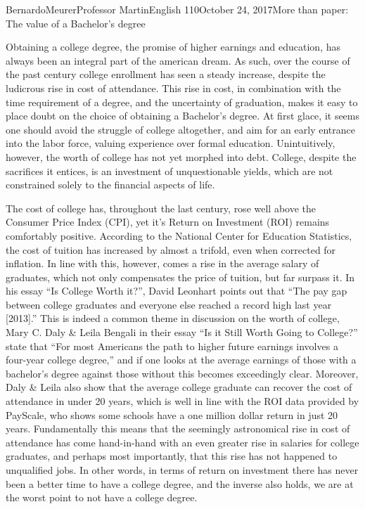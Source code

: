 \documentclass[12pt,letterpaper]{article}
\begin{document}
        \begin{mla}{Bernardo}{Meurer}{Professor Martin}{English 110}{October 24, 2017}{More than paper: The value of a Bachelor's degree}
        
        Obtaining a college degree, the promise of higher earnings and education, has always been an integral part of the american dream. As such, over the course of the past century college enrollment has seen a steady increase, despite the ludicrous rise in cost of attendance. This rise in cost, in combination with the time requirement of a degree, and the uncertainty of graduation, makes it easy to place doubt on the choice of obtaining a Bachelor's degree. At first glace, it seems one should avoid the struggle of college altogether, and aim for an early entrance into the labor force, valuing experience over formal education. Unintuitively, however, the worth of college has not yet morphed into debt. College, despite the sacrifices it entices, is an investment of unquestionable yields, which are not constrained solely to the financial aspects of life.
    
        The cost of college has, throughout the last century, rose well above the Consumer Price Index (CPI), yet it's Return on Investment (ROI) remains comfortably positive. According to the National Center for Education Statistics, the cost of tuition has increased by almost a trifold, even when corrected for inflation. In line with this, however, comes a rise in the average salary of graduates, which not only compensates the price of tuition, but far surpass it. In his essay ``Is College Worth it?'', David Leonhart points out that ``The pay gap between college graduates and everyone else reached a record high last year [2013].'' This is indeed a common theme in discussion on the worth of college, Mary C. Daly \& Leila Bengali in their essay ``Is it Still Worth Going to College?'' state that ``For most Americans the path to higher future earnings involves a four-year college degree,'' and if one looks at the average earnings of those with a bachelor's degree against those without this becomes exceedingly clear. Moreover, Daly \& Leila also show that the average college graduate can recover the cost of attendance in under 20 years, which is well in line with the ROI data provided by PayScale, who shows some schools have a one million dollar return in just 20 years. Fundamentally this means that the seemingly astronomical rise in cost of attendance has come hand-in-hand with an even greater rise in salaries for college graduates, and perhaps most importantly, that this rise has not happened to unqualified jobs. In other words, in terms of return on investment there has never been a better time to have a college degree, and the inverse also holds, we are at the worst point to not have a college degree.
    

\end{mla}
\end{document}
